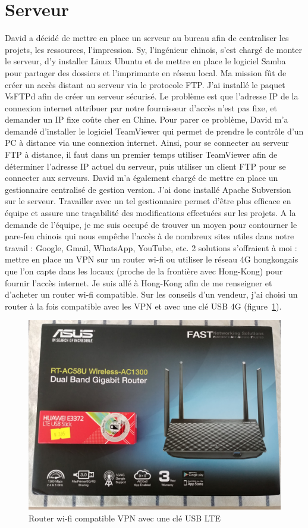 \documentclass[a4paper, 12pt, sffamily]{report}
\begin{document}
\section{Serveur}
David a décidé de mettre en place un serveur au bureau afin de centraliser les projets, les ressources, l’impression. Sy, l’ingénieur chinois, s’est chargé de monter le serveur, d’y installer Linux Ubuntu et de mettre en place le logiciel Samba pour partager des dossiers et l’imprimante en réseau local. Ma mission fût de créer un accès distant au serveur via le protocole FTP. J’ai installé le paquet VsFTPd afin de créer un serveur sécurisé. Le problème est que l’adresse IP de la connexion internet attribuer par notre fournisseur d’accès n’est pas fixe, et demander un IP fixe coûte cher en Chine. Pour parer ce problème, David m’a demandé d’installer le logiciel TeamViewer qui permet de prendre le contrôle d’un PC à distance via une connexion internet. Ainsi, pour se connecter au serveur FTP à distance, il faut dans un premier temps utiliser TeamViewer afin de déterminer l’adresse IP actuel du serveur, puis utiliser un client FTP pour se connecter aux serveurs.
David m’a également chargé de mettre en place un gestionnaire centralisé de gestion version. J’ai donc installé Apache Subversion sur le serveur. Travailler avec un tel gestionnaire permet d’être plus efficace en équipe et assure une traçabilité des modifications effectuées sur les projets.
A la demande de l’équipe, je me suis occupé de trouver un moyen pour contourner le pare-feu chinois qui nous empêche l’accès à de nombreux sites utiles dans notre travail : Google, Gmail, WhatsApp, YouTube, etc. 2 solutions s’offraient à moi : mettre en place un VPN sur un router wi-fi ou utiliser le réseau 4G hongkongais que l’on capte dans les locaux (proche de la frontière avec Hong-Kong) pour fournir l’accès internet. Je suis allé à Hong-Kong afin de me renseigner et d’acheter un router wi-fi compatible. Sur les conseils d’un vendeur, j’ai choisi un router à la fois compatible avec les VPN et avec une clé USB 4G (figure~\ref{fig:wifi_router}).

\begin{figure}[H]
\centering
\includegraphics[scale=0.12]{figures/photos/wifi_router.jpg}
\caption{Router wi-fi compatible VPN avec une clé USB LTE}
\label{fig:wifi_router}
\end{figure}
\end{document}
